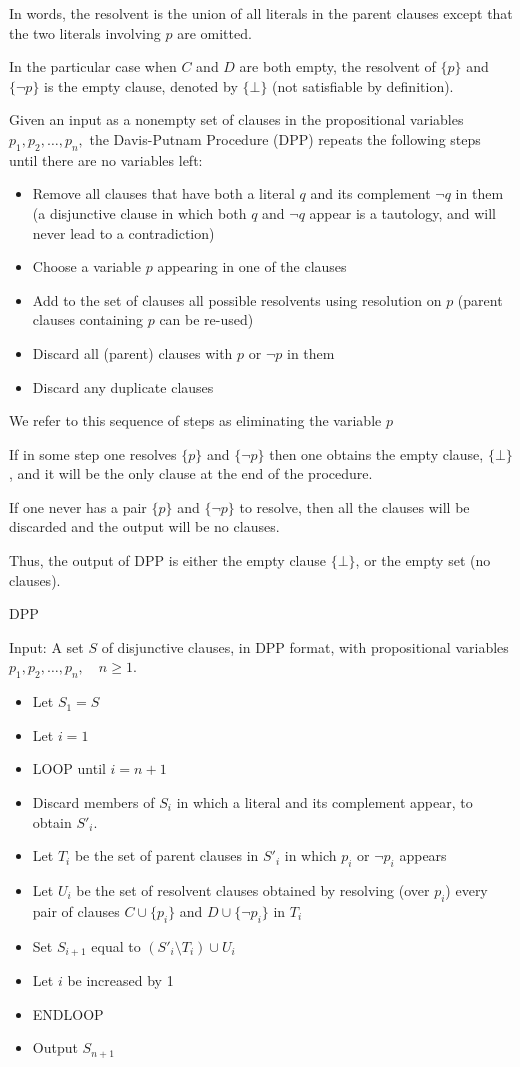 \documentclass{article}
\begin{document}
In words, the resolvent is the union of all literals in the parent clauses except that the two literals involving $p$ are omitted.

In the particular case when $C$ and $D$ are both empty, the resolvent of $\{p\}$ and $\{\neg p\}$ is the empty clause, denoted by $\{\bot\}$ (not satisfiable by definition).

Given an input as a nonempty set of clauses in the propositional variables $p_1, p_2, \ldots, p_n,$ the Davis-Putnam Procedure (DPP) repeats the following steps until there are no variables left:
\begin{itemize}
    \item Remove all clauses that have both a literal $q$ and its complement $\neg q$ in them (a disjunctive clause in which both $q$ and $\neg q$ appear is a tautology, and will never lead to a contradiction)
    \item Choose a variable $p$ appearing in one of the clauses
    \item Add to the set of clauses all possible resolvents using resolution on $p$ (parent clauses containing $p$ can be re-used)
    \item Discard all (parent) clauses with $p$ or $\neg p$ in them
    \item Discard any duplicate clauses
\end{itemize}

We refer to this sequence of steps as eliminating the variable $p$

If in some step one resolves $\{p\}$ and $\{\neg p\}$ then one obtains the empty clause, $\{\bot\}$, and it will be the only clause at the end of the procedure.

If one never has a pair $\{p\}$ and $\{\neg p\}$ to resolve, then all the clauses will be discarded and the output will be no clauses.

Thus, the output of DPP is either the empty clause $\{\bot\}$, or the empty set (no clauses).

DPP

Input: A set $S$ of disjunctive clauses, in DPP format, with propositional variables $p_1, p_2, \ldots, p_n, \quad n \ge 1$.
\begin{itemize}
    \item Let $S_1 = S$ 
    \item Let $i = 1$
    \item LOOP until $i = n+1$
    \item Discard members of $S_i$ in which a literal and its complement appear, to obtain $S'_i$.
    \item Let $T_i$ be the set of parent clauses in $S'_i$ in which $p_i$ or $\neg p_i$ appears
    \item Let $U_i$ be the set of resolvent clauses obtained by resolving (over $p_i$) every pair of clauses $C \cup \{p_i\}$ and $D \cup \{\neg p_i\}$ in $T_i$
    \item Set $S_{i+1}$ equal to $(S'_i \setminus T_i) \cup U_i$
    \item Let $i$ be increased by 1
    \item ENDLOOP
    \item Output $S_{n+1}$
\end{itemize}
\end{document}
